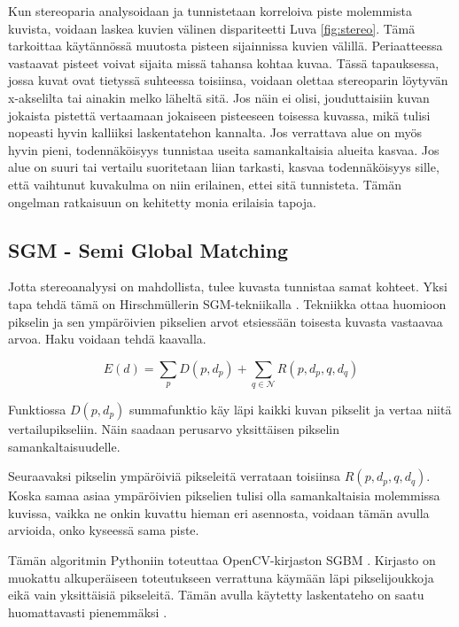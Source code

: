 Kun stereoparia analysoidaan ja tunnistetaan korreloiva piste molemmista kuvista,  
voidaan laskea kuvien välinen dispariteetti Luva \ref{fig:stereo}. 
Tämä tarkoittaa käytännössä muutosta pisteen sijainnissa kuvien välillä. 
Periaatteessa vastaavat pisteet voivat sijaita missä tahansa kohtaa kuvaa.  
Tässä tapauksessa, jossa kuvat ovat tietyssä suhteessa toisiinsa, 
voidaan olettaa stereoparin löytyvän x-akselilta tai ainakin melko läheltä sitä.  
Jos näin ei olisi, jouduttaisiin kuvan jokaista pistettä vertaamaan jokaiseen pisteeseen toisessa kuvassa,  
mikä tulisi nopeasti hyvin kalliiksi laskentatehon kannalta.  
Jos verrattava alue on myös hyvin pieni, todennäköisyys tunnistaa useita samankaltaisia alueita kasvaa.  
Jos alue on suuri tai vertailu suoritetaan liian tarkasti,  
kasvaa todennäköisyys sille, että vaihtunut kuvakulma on niin erilainen, ettei sitä tunnisteta.  
Tämän ongelman ratkaisuun on kehitetty monia erilaisia tapoja.  

\subsection{SGM - Semi Global Matching}

Jotta stereoanalyysi on mahdollista,
tulee kuvasta tunnistaa samat kohteet.
Yksi tapa tehdä tämä on Hirschmüllerin SGM-tekniikalla \cite{hirschmuller2005babel}.  
Tekniikka ottaa huomioon pikselin ja sen ympäröivien pikselien arvot etsiessään toisesta kuvasta vastaavaa arvoa. Haku voidaan tehdä kaavalla.

\begin{equation}\label{yht:SGM}
    E(d) = \sum_{p} D(p, d_p) + \sum_{q \in \mathcal{N}} R(p, d_p, q, d_q)
\end{equation}

Funktiossa \(D(p, d_p)\) summafunktio käy läpi kaikki kuvan pikselit ja vertaa niitä vertailupikseliin.  
Näin saadaan perusarvo yksittäisen pikselin samankaltaisuudelle.  

Seuraavaksi pikselin ympäröiviä pikseleitä verrataan toisiinsa \(R(p, d_p, q, d_q)\).  
Koska samaa asiaa ympäröivien pikselien tulisi olla samankaltaisia molemmissa kuvissa,  
vaikka ne onkin kuvattu hieman eri asennosta, voidaan tämän avulla arvioida, onko kyseessä sama piste.  

Tämän algoritmin Pythoniin toteuttaa OpenCV-kirjaston SGBM \cite{opencvsgbm}.  
Kirjasto on muokattu alkuperäiseen toteutukseen verrattuna käymään läpi pikselijoukkoja eikä vain yksittäisiä pikseleitä.  
Tämän avulla käytetty laskentateho on saatu huomattavasti pienemmäksi \cite{MemoryEfficientSGM}.  

